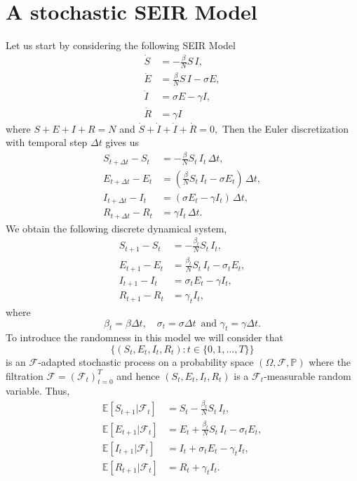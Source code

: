 \documentclass[12pt]{article}\usepackage[]{graphicx}\usepackage[]{color}
\begin{document}
\section{A stochastic SEIR Model}

Let us start by considering the following SEIR Model
\begin{align}
\dot{S} & = - \frac{\beta}{N} S \,I, \label{bPSEIR1}\\
\dot{E} & = \frac{\beta}{N} S \,I - \sigma E, \label{bPSEIR2} \\
\dot{I} & = \sigma E - \gamma I, \label{bPSEIR3}\\
\dot{R} & = \gamma I  \label{bPSEIR4}
\end{align}
where $S+E+I+R = N$ and $\dot{S}+\dot{I}+\dot{I}+\dot{R} =0,$ Then
the Euler discretization with temporal step $\Delta t$ gives us
\begin{align}
S_{t+\Delta t}-S_t & =  - \frac{\beta}{N} S_t \,I_t \, \Delta t, \label{ccPSEIR1}\\
E_{t+\Delta t}-E_t & = (\frac{\beta}{N} S_t \,I_t - \sigma E_t)\, \Delta t, \label{ccPSEIR2} \\
I_{t+\Delta t}-I_t & =  (\sigma E_t - \gamma I_t)\, \Delta t, \label{ccPSEIR3} \\ 
R_{t+\Delta t}-R_t & = \gamma I_t \, \Delta t. \label{ccPSEIR4}
\end{align}
We obtain the following discrete dynamical system,
\begin{align}
S_{t+1}-S_t & =  - \frac{\beta_t}{N} S_t \,I_t , \label{cPSEIR1}\\
E_{t+1}-E_t & =\frac{\beta_t}{N} S_t \,I_t - \sigma_t E_t, \label{cPSEIR2} \\
I_{t+1}-I_t & =  \sigma_t E_t - \gamma I_t, \label{cPSEIR3} \\ 
R_{t+1}-R_t & = \gamma_t I_t, \label{cPSEIR4}
\end{align}
where
$$
\beta_t = \beta \Delta t, \quad \sigma_t = \sigma \Delta t\, \text{ and } \gamma_t = \gamma \Delta t.
$$
To introduce the randomness in this model we will consider that
$$\{(S_t,E_t,I_t,R_t) : t \in \{0,1,\ldots,T\}\}$$ is an $\mathcal{F}$-adapted stochastic process on a probability
space $(\Omega,\mathcal{F},\mathbb{P})$ where the filtration $\mathcal{F}=(\mathcal{F}_t)_{t=0}^T$ and hence 
$(S_t,E_t,I_t,R_t)$ is a $\mathcal{F}_t$-measurable random variable. Thus,
\begin{align}
\mathbb{E}[S_{t+1}|\mathcal{F}_t] & =  S_t - \frac{\beta_t}{N} S_t \,I_t , \label{dPSEIR1}\\
\mathbb{E}[E_{t+1}|\mathcal{F}_t] & = E_t + \frac{\beta_t}{N} S_t \,I_t - \sigma_t E_t, \label{dPSEIR2} \\
\mathbb{E}[I_{t+1}|\mathcal{F}_t] & = I_t + \sigma_t E_t - \gamma_t I_t, \label{dPSEIR3} \\ 
\mathbb{E}[R_{t+1} |\mathcal{F}_t] & =R_t + \gamma_t I_t. \label{dPSEIR4}
\end{align}
\end{document}
